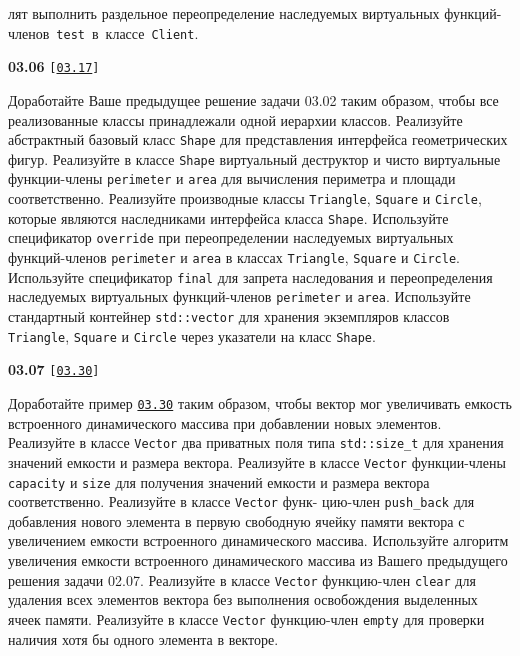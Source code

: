 \documentclass[a4paper,12pt]{article}
\begin{document}
лят выполнить раздельное переопределение наследуемых виртуальных функций-членов~\lstinline{test}~в~классе~\lstinline{Client}.

\bigskip

{\large \textbf{03.06} \texttt{[\href{https://github.com/i-s-m-mipt/Education/blob/master/projects/examples/source/03.17.cpp}{\texttt{03.17}}]}}

\bigskip

Доработайте Ваше предыдущее решение задачи 03.02 таким образом, чтобы все реализованные классы принадлежали одной иерархии классов. Реализуйте абстрактный базовый класс \lstinline{Shape} для представления интерфейса геометрических фигур. Реализуйте в классе \lstinline{Shape} виртуальный деструктор и чисто виртуальные функции-члены \lstinline{perimeter} и \lstinline{area} для вычисления периметра и площади соответственно. Реализуйте производные классы \lstinline{Triangle}, \lstinline{Square} и \lstinline{Circle}, которые являются наследниками интерфейса класса \lstinline{Shape}. Используйте спецификатор \lstinline{override} при переопределении наследуемых виртуальных функций-членов \lstinline{perimeter} и \lstinline{area} в классах \lstinline{Triangle}, \lstinline{Square} и \lstinline{Circle}. Используйте спецификатор \lstinline{final} для запрета наследования и переопределения наследуемых виртуальных функций-членов \lstinline{perimeter} и \lstinline{area}. Используйте стандартный контейнер \lstinline{std::vector} для хранения экземпляров классов \lstinline{Triangle}, \lstinline{Square} и \lstinline{Circle} через указатели на класс \lstinline{Shape}.

\bigskip

{\large \textbf{03.07} \texttt{[\href{https://github.com/i-s-m-mipt/Education/blob/master/projects/examples/source/03.30.cpp}{\texttt{03.30}}]}}

\bigskip

Доработайте пример \href{https://github.com/i-s-m-mipt/Education/blob/master/projects/examples/source/03.30.cpp}{\texttt{03.30}} таким образом, чтобы вектор мог увеличивать емкость встроенного динамического массива при добавлении новых элементов. Реализуйте в классе \lstinline{Vector} два приватных поля типа \lstinline{std::size_t} для хранения значений емкости и размера вектора. Реализуйте в классе \lstinline{Vector} функции-члены \lstinline{capacity} и \lstinline{size} для получения значений емкости и размера вектора соответственно. Реализуйте в классе \lstinline{Vector} функ- цию-член \lstinline{push_back} для добавления нового элемента в первую свободную ячейку памяти вектора с увеличением емкости встроенного динамического массива. Используйте алгоритм увеличения емкости встроенного динамического массива из Вашего предыдущего решения задачи 02.07. Реализуйте в классе \lstinline{Vector} функцию-член \lstinline{clear} для удаления всех элементов вектора без выполнения освобождения выделенных ячеек памяти. Реализуйте в классе \lstinline{Vector} функцию-член \lstinline{empty} для проверки наличия хотя бы одного элемента в векторе.
\end{document}
